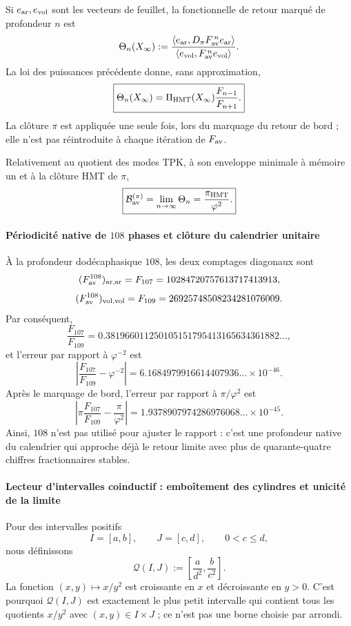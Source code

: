 Si \(e_{\rm ar},e_{\rm vol}\) sont les vecteurs de feuillet, la fonctionnelle de
retour marqué de profondeur \(n\) est
\[
 \Theta_n(X_\infty):=
 \frac{\langle e_{\rm ar},
 D_\pi F_{\rm av}^{\,n}e_{\rm ar}\rangle}
 {\langle e_{\rm vol},
 F_{\rm av}^{\,n}e_{\rm vol}\rangle}.
\]
La loi des puissances précédente donne, sans approximation,
\[
 \boxed{
 \Theta_n(X_\infty)
 =\Pi_{\rm HMT}(X_\infty)\frac{F_{n-1}}{F_{n+1}}.}
\]
La clôture \(\pi\) est appliquée une seule fois, lors du marquage du retour de bord ; elle n'est pas
réintroduite à chaque itération de \(F_{\rm av}\).

\begin{corollary}
\label{p12-83-c16-s3:cor:pi-phi2-corta}
Relativement au quotient des modes TPK, à son enveloppe minimale à mémoire
un et à la clôture HMT de \(\pi\),
\[
 \boxed{\mathcal B_{\rm av}^{(\pi)}
 =\lim_{n\to\infty}\Theta_n
 =\frac{\pi_{\rm HMT}}{\varphi^2}.}
\]
\end{corollary}

\paragraph{Périodicité native de \(108\) phases et clôture du calendrier unitaire}
À la profondeur dodécaphasique \(108\), les deux comptages diagonaux sont
\[
 (F_{\rm av}^{108})_{\rm ar,ar}
 =F_{107}=10284720757613717413913,
\]
\[
 (F_{\rm av}^{108})_{\rm vol,vol}
 =F_{109}=26925748508234281076009.
\]
Par conséquent,
\[
 \frac{F_{107}}{F_{109}}
 =0.381966011250105151795413165634361882\ldots,
\]
et l'erreur par rapport à \(\varphi^{-2}\) est
\[
 \left|\frac{F_{107}}{F_{109}}-\varphi^{-2}\right|
 =6.1684979916614407936\ldots\times10^{-46}.
\]
Après le marquage de bord, l'erreur par rapport à
\(\pi/\varphi^2\) est
\[
 \left|\pi\frac{F_{107}}{F_{109}}-\frac{\pi}{\varphi^2}\right|
 =1.9378907974286976068\ldots\times10^{-45}.
\]
Ainsi, \(108\) n'est pas utilisé pour ajuster le rapport : c'est une profondeur native du
calendrier qui approche déjà le retour limite avec plus de quarante-quatre
chiffres fractionnaires stables.

\paragraph{Lecteur d'intervalles coinductif : emboîtement des cylindres et unicité de la limite}
Pour des intervalles positifs
\[
 I=[a,b],\qquad J=[c,d],\qquad 0<c\leq d,
\]
nous définissons
\[
 \mathcal Q(I,J):=
 \left[\frac{a}{d^2},\frac{b}{c^2}\right].
\]
La fonction \((x,y)\mapsto x/y^2\) est croissante en \(x\) et décroissante en
\(y>0\). C'est pourquoi \(\mathcal Q(I,J)\) est exactement le plus petit intervalle
qui contient tous les quotients \(x/y^2\) avec
\((x,y)\in I\times J\) ; ce n'est pas une borne choisie par arrondi.

